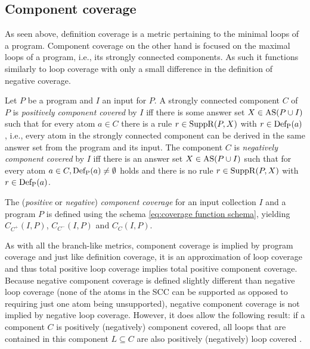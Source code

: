 \subsection{Component coverage}
\label{subsec:Coverage cetrics/Branch-like coverage/Component coverage}
As seen above, definition coverage is a metric pertaining to the minimal loops of a program. Component coverage on the other hand is focused on the maximal loops of a program, i.e., its strongly connected components. As such it functions similarly to loop coverage with only a small difference in the definition of negative coverage.

\begin{definition}
\label{def:component coverage}
    Let $P$ be a program and $I$ an input for $P$. A strongly connected component $C$ of $P$ is \emph{positively component covered} by $I$ iff there is some answer set \(X \in \operatorname{AS}(P \cup I)\) such that for every atom \(a \in C\) there is a rule \(r \in \operatorname{SuppR}(P, X)\) with \(r \in \operatorname{Def_P}(a)\), i.e., every atom in the strongly connected component can be derived in the same answer set from the program and its input.
    The component $C$ is \emph{negatively component covered} by $I$ iff there is an answer set \(X \in \operatorname{AS}(P \cup I)\) such that for every atom \(a \in C, \operatorname{Def_P}(a) \neq \emptyset\) holds and there is no rule \(r \in \operatorname{SuppR}(P, X)\) with \(r \in \operatorname{Def_P}(a)\).
\end{definition}

The (\emph{positive} or \emph{negative}) \emph{component coverage} for an input collection $I$ and a program $P$ is defined using the schema \ref{eq:coverage function schema}, yielding \(C_{C^+}(I, P)\), \(C_{C^-}(I, P)\) and \(C_{C}(I, P)\).

As with all the branch-like metrics, component coverage is implied by program coverage and just like definition coverage, it is an approximation of loop coverage and thus total positive loop coverage implies total positive component coverage.
Because negative component coverage is defined slightly different than negative loop coverage (none of the atoms in the SCC can be supported as opposed to requiring just one atom being unsupported), negative component coverage is not implied by negative loop coverage. However, it does allow the following result: if a component $C$ is positively (negatively) component covered, all loops that are contained in this component \(L \subseteq C\) are also positively (negatively) loop covered \cite[Theorem 7]{Jan+10}.

